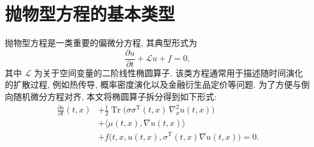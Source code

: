   \section{抛物型方程的基本类型}\label{sec:ppde}
    抛物型方程是一类重要的偏微分方程, 其典型形式为
    \begin{equation}
      \frac{\partial u}{\partial t} + \mathcal{L} u + f = 0,
      \label{eq:ppde0}
    \end{equation}
    其中 $\mathcal{L}$ 为关于空间变量的二阶线性椭圆算子.
    该类方程通常用于描述随时间演化的扩散过程, 例如热传导, 概率密度演化以及金融衍生品定价等问题.
    为了方便与倒向随机微分方程对齐, 本文将椭圆算子拆分得到如下形式:
    \begin{equation}
      \begin{aligned}
        \frac{\partial u}{\partial t}(t, x)
        &+ \frac{1}{2} \operatorname{Tr}\!\big(
        \sigma\sigma^{\operatorname{T}}(t, x)\, \nabla_x^2 u(t, x) \big) \\
        &+ \langle \mu(t, x), \nabla u(t, x) \rangle \\
        &+ f\!\big( t, x, u(t,x), \sigma^{\operatorname{T}}(t, x) \nabla u(t, x) \big)
        = 0.
      \end{aligned}
      \label{eq:ppde}
    \end{equation}

